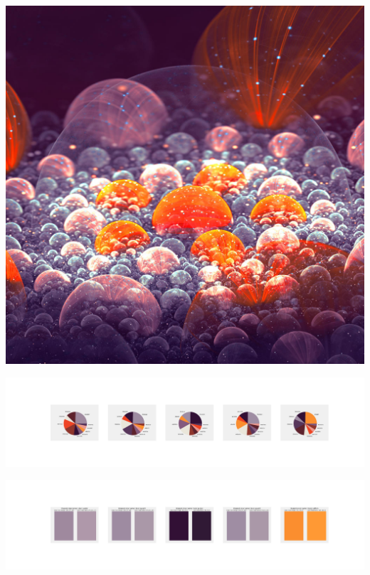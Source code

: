 \documentclass[11pt]{article}
\begin{document}
\begin{landscape}
    \begin{center}
    \includegraphics[width=\textwidth]{./nbimg/file (312).jpg}
    \end{center}

    \begin{center}
    \includegraphics[width=250mm]{./nbimg/pie-237.jpg}
    \end{center}

    \begin{center}
    \includegraphics[width=250mm]{./nbimg/peak-237.jpg}
    \end{center}
    


\end{landscape}
\end{document}
